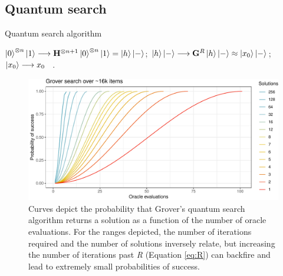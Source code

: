 \documentclass[12pt]{article} %
\DeclarePairedDelimiter{\ceil}{\lceil}{\rceil}
\begin{document}
\subsection{Quantum search}

\begin{algorithm}[t!]
	\caption{Quantum search algorithm \citep{grover1996fast}}\label{alg:grover}
	$\ket{0}^{\otimes n}\ket{1} \longrightarrow \mathbf{H}^{\otimes n+1}\ket{0}^{\otimes n}\ket{1}=\ket{h}\ket{-}$; \hspace{5em}  
	$\ket{h}\ket{-} \longrightarrow \mathbf{G}^R \ket{h}\ket{-} \approx \ket{x_0}\ket{-}$;    \hspace{3em}         
	$\ket{x_0} \longrightarrow x_0$\;
	\ .
		\vspace{0.5em}
		
\end{algorithm}

\begin{figure}[!t]
	\centering
	\includegraphics[width=0.9\linewidth]{groverCurves.pdf}
	\caption{Curves depict the probability that Grover's quantum search algorithm returns a solution as a function of the number of oracle evaluations. For the ranges depicted, the number of iterations required and the number of solutions inversely relate, but increasing the number of iterations past \emph{R} (Equation \ref{eq:R}) can backfire and lead to extremely small probabilities of success.  }\label{fig:grov}
\end{figure}
\end{document}
